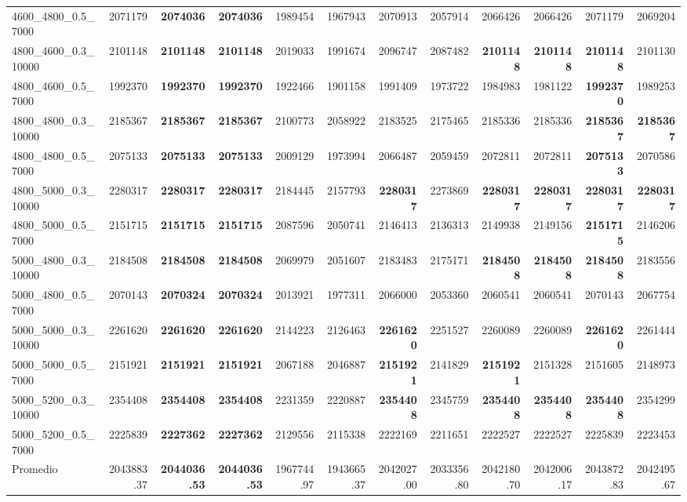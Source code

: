 \begin{landscape}
\begin{longtable}{lrrrrrrrrrrr}
4600\_4800\_0.5\_7000 & 2071179 & \textbf{2074036} & \textbf{2074036} & 1989454 & 1967943 & 2070913 & 2057914 & 2066426 & 2066426 & 2071179 & 2069204\\
4800\_4600\_0.3\_10000 & 2101148 & \textbf{2101148} & \textbf{2101148} & 2019033 & 1991674 & 2096747 & 2087482 & \textbf{2101148} & \textbf{2101148} & \textbf{2101148} & 2101130\\
4800\_4600\_0.5\_7000 & 1992370 & \textbf{1992370} & \textbf{1992370} & 1922466 & 1901158 & 1991409 & 1973722 & 1984983 & 1981122 & \textbf{1992370} & 1989253\\
4800\_4800\_0.3\_10000 & 2185367 & \textbf{2185367} & \textbf{2185367} & 2100773 & 2058922 & 2183525 & 2175465 & 2185336 & 2185336 & \textbf{2185367} & \textbf{2185367}\\
4800\_4800\_0.5\_7000 & 2075133 & \textbf{2075133} & \textbf{2075133} & 2009129 & 1973994 & 2066487 & 2059459 & 2072811 & 2072811 & \textbf{2075133} & 2070586\\
4800\_5000\_0.3\_10000 & 2280317 & \textbf{2280317} & \textbf{2280317} & 2184445 & 2157793 & \textbf{2280317} & 2273869 & \textbf{2280317} & \textbf{2280317} & \textbf{2280317} & \textbf{2280317}\\
4800\_5000\_0.5\_7000 & 2151715 & \textbf{2151715} & \textbf{2151715} & 2087596 & 2050741 & 2146413 & 2136313 & 2149938 & 2149156 & \textbf{2151715} & 2146206\\
5000\_4800\_0.3\_10000 & 2184508 & \textbf{2184508} & \textbf{2184508} & 2069979 & 2051607 & 2183483 & 2175171 & \textbf{2184508} & \textbf{2184508} & \textbf{2184508} & 2183556\\
5000\_4800\_0.5\_7000 & 2070143 & \textbf{2070324} & \textbf{2070324} & 2013921 & 1977311 & 2066000 & 2053360 & 2060541 & 2060541 & 2070143 & 2067754\\
5000\_5000\_0.3\_10000 & 2261620 & \textbf{2261620} & \textbf{2261620} & 2144223 & 2126463 & \textbf{2261620} & 2251527 & 2260089 & 2260089 & \textbf{2261620} & 2261444\\
5000\_5000\_0.5\_7000 & 2151921 & \textbf{2151921} & \textbf{2151921} & 2067188 & 2046887 & \textbf{2151921} & 2141829 & \textbf{2151921} & 2151328 & 2151605 & 2148973\\
5000\_5200\_0.3\_10000 & 2354408 & \textbf{2354408} & \textbf{2354408} & 2231359 & 2220887 & \textbf{2354408} & 2345759 & \textbf{2354408} & \textbf{2354408} & \textbf{2354408} & 2354299\\
5000\_5200\_0.5\_7000 & 2225839 & \textbf{2227362} & \textbf{2227362} & 2129556 & 2115338 & 2222169 & 2211651 & 2222527 & 2222527 & 2225839 & 2223453\\
\midrule
Promedio & 2043883.37 & \textbf{2044036.53} & \textbf{2044036.53} & 1967744.97 & 1943665.37 & 2042027.00 & 2033356.80 & 2042180.70 & 2042006.17 & 2043872.83 & 2042495.67\\
\end{longtable}\endgroup\clearpage

\end{landscape}

